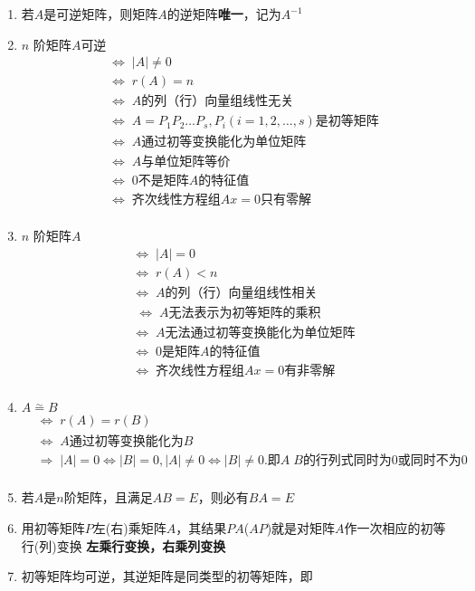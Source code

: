 \documentclass[a4paper,12pt]{article}
\begin{document}
    \begin{enumerate}
        \item 若$A$是可逆矩阵，则矩阵$A$的逆矩阵\textbf{唯一}，记为$A^{-1}$
        \item $n$ 阶矩阵$A$可逆
        \begin{align*}
            &\Leftrightarrow\; |A| \neq 0  \\
            &\Leftrightarrow\; r(A) = n  \\
            &\Leftrightarrow\; A \text{的列（行）向量组线性无关}  \\
            &\Leftrightarrow\; A = P_{1}P_{2}\dots P_{s}, P_{i}(i = 1,2,\dots,s)\text{是初等矩阵}  \\
            &\Leftrightarrow\; A \text{通过初等变换能化为单位矩阵}  \\
            &\Leftrightarrow\; A \text{与单位矩阵等价}  \\
            &\Leftrightarrow\; 0\text{不是矩阵} A \text{的特征值}  \\
            &\Leftrightarrow\; \text{齐次线性方程组} Ax = 0 \text{只有零解}  \\
        \end{align*}
        \item $n$ 阶矩阵$A${\color{red}{不可逆}}
        \begin{align*}
            &\Leftrightarrow\; |A| = 0  \\
            &\Leftrightarrow\; r(A) < n  \\
            &\Leftrightarrow\; A \text{的列（行）向量组线性相关}  \\
            &\;\Leftrightarrow\; A \text{无法表示为初等矩阵的乘积} \\
            &\Leftrightarrow\; A \text{无法通过初等变换能化为单位矩阵}  \\
            &\Leftrightarrow\; 0\text{是矩阵} A \text{的特征值}  \\
            &\Leftrightarrow\; \text{齐次线性方程组} Ax = 0 \text{有非零解}  \\
        \end{align*}
        \item $A \overset{\sim}{=} B$
        \begin{align*}
            &\Leftrightarrow\; r(A) = r(B)  \\
            &\Leftrightarrow\; A \text{通过初等变换能化为} B  \\
            &\Rightarrow\; |A| = 0 \Leftrightarrow |B| = 0, |A| \neq 0 \Leftrightarrow |B| \neq 0. \text{即}A\;B\text{的行列式同时为0或同时不为0}  \\
        \end{align*}
        \item 若$A$是$n$阶矩阵，且满足$AB = E$，则必有$BA = E$
        \item 用初等矩阵$P$左(右)乘矩阵$A$，其结果$PA$($AP$)就是对矩阵$A$作一次相应的初等行(列)变换 \; \Rightarrow \textbf{左乘行变换，右乘列变换}
        \item 初等矩阵均可逆，其逆矩阵是同类型的初等矩阵，即


\end{enumerate}
\end{document}
